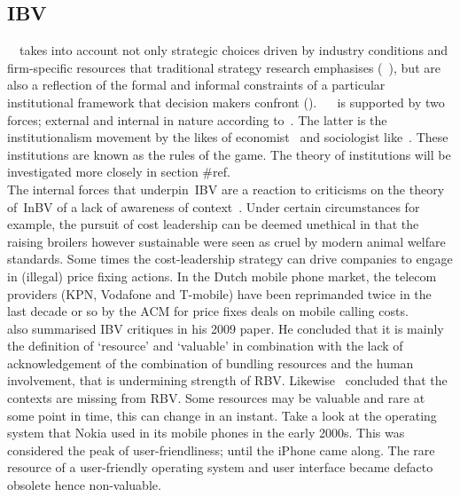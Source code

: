 \subsection{\glsdesc{IBV}}
 
~\ibv~takes into account not only strategic choices driven by industry conditions and firm-specific resources that traditional strategy research emphasises (~\cite{Porter:1980,Barney:1991}), but are also a reflection of the formal and informal constraints of a particular institutional framework that decision makers confront (\cite{Oliver:1997,Scott:1995}). 
~\ibv~ is supported by two forces; external and internal in nature according to~\cite{Peng:2009}. 
The latter is the institutionalism movement by the likes of economist~\cite{North:1990} and sociologist like~\cite{DiMaggio:1983,Scott:1995}. 
These institutions are known as the rules of the game.
The theory of institutions will be investigated more closely in section #ref.\\

The internal forces that underpin~\gls{IBV} are a reaction to criticisms on the theory of~\gls{InBV} of a lack of awareness of context~\cite{Narayanan:2005}. 
Under certain circumstances for example, the pursuit of cost leadership can be deemed unethical in that the raising broilers however sustainable were seen as cruel by modern animal welfare standards. 
Some times the cost-leadership strategy can drive companies to engage in (illegal) price fixing actions. 
In the Dutch mobile phone market, the telecom providers (KPN, Vodafone and T-mobile) have been reprimanded twice in the last decade or so by the \gls{ACM} for price fixes deals on mobile calling costs. \\

\cite{Kraaijenbrink:2009} also summarised \gls{IBV} critiques in his 2009 paper. 
He concluded that it is mainly the definition of `resource' and `valuable' in combination with the lack of acknowledgement of the combination of bundling resources and the human involvement, that is undermining strength of \gls{RBV}.
Likewise~\cite{Priem:2001} concluded that the contexts are missing from \gls{RBV}. Some resources may be valuable and rare at some point in time, this can change in an instant. 
Take a look at the operating system that Nokia used in its mobile phones in the early 2000s. 
This was considered the peak of user-friendliness; until the iPhone came along. 
The rare resource of a user-friendly operating system and user interface became defacto obsolete hence non-valuable.\\

